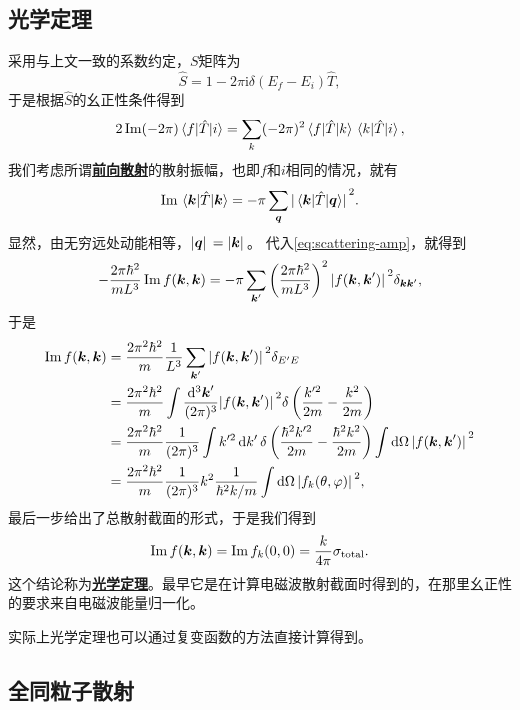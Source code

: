 \documentclass[UTF8, a4paper]{ctexart}
\newcommand*{\ii}{\mathrm{i}}
\newcommand{\concept}[1]{\underline{\textbf{#1}}}
\begin{document}
\subsection{光学定理}

采用与上文一致的系数约定，$S$矩阵为
\[
    \hat{S} = 1 - 2 \pi \ii \delta(E_f - E_i) \hat{T},
\]
于是根据$\hat{S}$的幺正性条件得到
\[
    2 \Im (- 2 \pi) \mel*{f}{\hat{T}}{i} = \sum_k (- 2 \pi)^2 \mel*{f}{\hat{T}}{k} \mel*{k}{\hat{T}}{i},
\]
我们考虑所谓\concept{前向散射}的散射振幅，也即$f$和$i$相同的情况，就有
\[
    \Im \mel*{\vb*{k}}{\hat{T}}{\vb*{k}} = - \pi \sum_{\vb*{q}} \abs*{\mel*{\vb*{k}}{\hat{T}}{\vb*{q}}}^2.
\]
显然，由无穷远处动能相等，$\abs*{\vb*{q}} = \abs*{\vb*{k}}$。
代入\eqref{eq:scattering-amp}，就得到
\[
    - \frac{2 \pi \hbar^2}{m L^3} \Im f(\vb*{k}, \vb*{k}) = - \pi \sum_{\vb*{k}'} \left( \frac{2 \pi \hbar^2}{m L^3} \right)^2 \abs*{f(\vb*{k}, \vb*{k}')}^2 \delta_{\vb*{k} \vb*{k}'},
\]
于是
\[
    \begin{aligned}
        \Im f(\vb*{k}, \vb*{k}) &= \frac{2\pi^2 \hbar^2}{m} \frac{1}{L^3} \sum_{\vb*{k}'} \abs*{f(\vb*{k}, \vb*{k}')}^2 \delta_{E' E} \\
        &= \frac{2\pi^2 \hbar^2}{m} \int \frac{\dd[3]{\vb*{k}'}}{(2\pi)^3} \abs*{f(\vb*{k}, \vb*{k}')}^2 \delta\left(\frac{k'^2}{2m} - \frac{k^2}{2m}\right) \\
        &= \frac{2\pi^2 \hbar^2}{m} \frac{1}{(2\pi)^3} \int k'^2 \dd{k'} \delta\left(\frac{\hbar^2 k'^2}{2m} - \frac{\hbar^2 k^2}{2m}\right) \int \dd{\Omega} \abs*{f(\vb*{k}, \vb*{k}')}^2 \\
        &= \frac{2\pi^2 \hbar^2}{m} \frac{1}{(2\pi)^3} k^2 \frac{1}{\hbar^2 k / m} \int \dd{\Omega} \abs*{f_k(\theta, \varphi)}^2 ,
    \end{aligned}
\]
最后一步给出了总散射截面的形式，于是我们得到
\begin{equation}
    \Im f(\vb*{k}, \vb*{k}) = \Im f_k(0, 0) = \frac{k}{4\pi} \sigma_\text{total}.
\end{equation}
这个结论称为\concept{光学定理}。最早它是在计算电磁波散射截面时得到的，在那里幺正性的要求来自电磁波能量归一化。

实际上光学定理也可以通过复变函数的方法直接计算得到。

\subsection{全同粒子散射}
\end{document}
